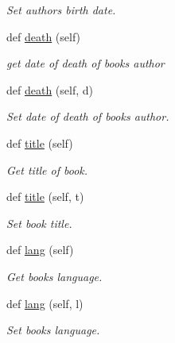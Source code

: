 \begin{DoxyCompactItemize}
\begin{DoxyCompactList}\small\item\em Set author\textquotesingle{}s birth date. \end{DoxyCompactList}\item 
def \hyperlink{classbridges_1_1data__src__dependent_1_1gutenberg__book_1_1_gutenberg_book_a2ad2399a95ded7f560fcb3a5293faf5d}{death} (self)
\begin{DoxyCompactList}\small\item\em get date of death of book\textquotesingle{}s author \end{DoxyCompactList}\item 
def \hyperlink{classbridges_1_1data__src__dependent_1_1gutenberg__book_1_1_gutenberg_book_aaa05c897d2d38783236362e76dfbcb41}{death} (self, d)
\begin{DoxyCompactList}\small\item\em Set date of death of book\textquotesingle{}s author. \end{DoxyCompactList}\item 
def \hyperlink{classbridges_1_1data__src__dependent_1_1gutenberg__book_1_1_gutenberg_book_aa26adb962fe01a2661f350fab167a144}{title} (self)
\begin{DoxyCompactList}\small\item\em Get title of book. \end{DoxyCompactList}\item 
def \hyperlink{classbridges_1_1data__src__dependent_1_1gutenberg__book_1_1_gutenberg_book_abc4d2b106849f50e0132a604c8874f0d}{title} (self, t)
\begin{DoxyCompactList}\small\item\em Set book title. \end{DoxyCompactList}\item 
def \hyperlink{classbridges_1_1data__src__dependent_1_1gutenberg__book_1_1_gutenberg_book_ae1a40aed2ffea863f790adcdd4c23702}{lang} (self)
\begin{DoxyCompactList}\small\item\em Get book\textquotesingle{}s language. \end{DoxyCompactList}\item 
def \hyperlink{classbridges_1_1data__src__dependent_1_1gutenberg__book_1_1_gutenberg_book_a002f29d2c4627e316d3debb02a8ed816}{lang} (self, l)
\begin{DoxyCompactList}\small\item\em Set book\textquotesingle{}s language. \end{DoxyCompactList}\item 

\end{DoxyCompactItemize}
